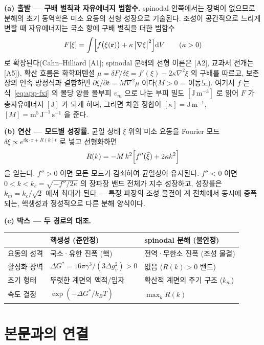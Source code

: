 \documentclass[11pt,a4paper]{article}
\newcommand{\dd}{\mathrm{d}}
\begin{document}
\textbf{(a) 출발 --- 구배 벌칙과 자유에너지 범함수.} spinodal 안쪽에서는 장벽이 없으므로 분해의
초기 동역학은 미소 요동의 선형 성장으로 기술된다. 조성이 공간적으로 느리게 변할 때 자유에너지는
국소 항에 구배 벌칙을 더한 범함수
\begin{equation}
F[\xi]=\int\Bigl[f\bigl(\xi(\mathbf{r})\bigr)+\kappa\,\bigl|\nabla\xi\bigr|^2\Bigr]\dd V
\qquad(\kappa>0)
\label{eq:app-ch-F}
\end{equation}
로 확장된다(Cahn--Hilliard [A1]; spinodal 분해의 선형 이론은 [A2], 교과서 전개는 [A5]).
확산 흐름은 화학퍼텐셜 $\mu=\delta F/\delta\xi=f'(\xi)-2\kappa\nabla^2\xi$
의 구배를 따르고, 보존장의 연속 방정식과 결합하면 $\partial\xi/\partial t=M\nabla^2\mu$ 이다($M>0$ =
이동도). 여기서 $f$ 는 식~\eqref{eq:app-fxi} 의 몰당 양을 몰부피 $v_m$ 으로 나눈 부피 밀도 $[\mathrm{J\,m^{-3}}]$ 로 읽어 $F$ 가 총자유에너지 $[\mathrm J]$ 가 되게 하며, 그러면 차원 정합이 $[\kappa]=\mathrm{J\,m^{-1}}$, $[M]=\mathrm{m^{5}\,J^{-1}\,s^{-1}}$ 을 준다.

\textbf{(b) 연산 --- 모드별 성장률.} 균일 상태 $\bar\xi$ 위의 미소 요동을 Fourier 모드
$\delta\xi\propto e^{i\mathbf{k}\cdot\mathbf{r}+R(k)t}$ 로 넣고 선형화하면
\begin{equation}
R(k)=-M\,k^2\Bigl[f''(\bar\xi)+2\kappa k^2\Bigr]
\label{eq:app-ch-R}
\end{equation}
을 얻는다. $f''>0$ 이면 모든 모드가 감쇠하여 균일상이 유지된다. $f''<0$ 이면
$0<k<k_c=\sqrt{-f''/2\kappa}$ 의 장파장 밴드 전체가 지수 성장하고, 성장률은
$k_m=k_c/\sqrt2$ 에서 최대가 된다 --- 특정 파장의 조성 물결이 계 전체에서 동시에 증폭되는, 핵생성과
정성적으로 다른 분해 양식이다.

\textbf{(c) 박스 --- 두 경로의 대조.}
\begin{center}
\begin{tabular}{@{}lll@{}}
\toprule
 & 핵생성 (준안정) & spinodal 분해 (불안정) \\
\midrule
요동의 성격 & 국소·유한 진폭 (핵) & 전역·무한소 진폭 (조성 물결) \\
활성화 장벽 & $\Delta G^\ast=16\pi\gamma^3/(3\Delta g_v^2)>0$ & 없음 ($R(k)>0$ 밴드) \\
초기 형태 & 뚜렷한 계면의 액적/입자 & 확산적 계면의 주기 구조 ($k_m$) \\
속도 결정 & $\exp(-\Delta G^\ast/k_BT)$ & $\max_k R(k)$ \\
\bottomrule
\end{tabular}
\end{center}

\section{본문과의 연결}\label{app:link}
\end{document}
